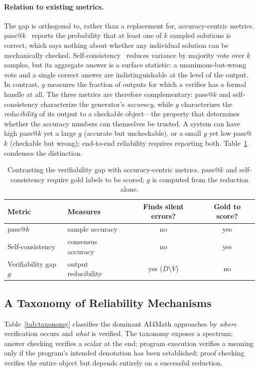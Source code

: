 \documentclass[11pt]{article}
\theoremstyle{definition}
\theoremstyle{plain}
\theoremstyle{remark}
\begin{document}
\paragraph{Relation to existing metrics.}
The gap is orthogonal to, rather than a replacement for, accuracy-centric metrics.
pass@$k$~\cite{chen2021codex} reports the probability that at least one of $k$ sampled
solutions is correct, which says nothing about whether any individual solution can be
mechanically checked. Self-consistency~\cite{wang2023selfconsistency} reduces variance by
majority vote over $k$ samples, but its aggregate answer is a surface statistic: a
unanimous-but-wrong vote and a single correct answer are indistinguishable at the level of
the output. In contrast, $g$ measures the fraction of outputs for which a verifier has a
formal handle at all. The three metrics are therefore complementary: pass@$k$ and
self-consistency characterize the generator's \emph{accuracy}, while $g$ characterizes the
\emph{reducibility} of its output to a checkable object---the property that determines whether
the accuracy numbers can themselves be trusted. A system can have high pass@$k$ yet a large
$g$ (accurate but uncheckable), or a small $g$ yet low pass@$k$ (checkable but wrong);
end-to-end reliability requires reporting both. Table~\ref{tab:metrics} condenses the
distinction.

\begin{table}[t]
\centering
\small
\begin{tabular}{@{}l l c c@{}}
\toprule
\textbf{Metric} & \textbf{Measures} & \textbf{Finds silent errors?} & \textbf{Gold to score?}\\
\midrule
pass@$k$ \cite{chen2021codex} & sample accuracy & no & yes\\
Self-consistency \cite{wang2023selfconsistency} & consensus accuracy & no & yes\\
Verifiability gap $g$ & output reducibility & yes ($D \setminus V$) & no\\
\bottomrule
\end{tabular}
\caption{Contrasting the verifiability gap with accuracy-centric metrics. pass@$k$ and
self-consistency require gold labels to be scored; $g$ is computed from the reduction alone.}
\label{tab:metrics}
\end{table}

\subsection{A Taxonomy of Reliability Mechanisms}
Table~\ref{tab:taxonomy} classifies the dominant AI4Math approaches by \emph{where}
verification occurs and \emph{what} is verified. The taxonomy exposes a spectrum: answer
checking verifies a scalar at the end; program execution verifies a meaning only if the
program's intended denotation has been established; proof checking verifies the entire object
but depends entirely on a successful reduction.
\end{document}
